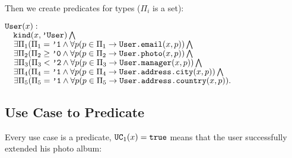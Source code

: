 \documentclass{article}
\begin{document}
        Then we create predicates for types ($\Pi_i$ is a set):

        \begin{maths}
        $\mbox{\texttt{User}}(x) :$ \\
        $\quad \mbox{\texttt{kind}}(x, \mbox{\texttt{'User}}) \bigwedge$ \\
        $\quad \exists \Pi_1 (\Pi_1 = \mbox{\texttt{'1}} \wedge \forall p(p \in \Pi_1 \to \mbox{\texttt{User.email}}(x, p)) \bigwedge$ \\
        $\quad \exists \Pi_2 (\Pi_2 \geq \mbox{\texttt{'0}} \wedge \forall p(p \in \Pi_2 \to \mbox{\texttt{User.photo}}(x, p)) \bigwedge$ \\
        $\quad \exists \Pi_3 (\Pi_3 < \mbox{\texttt{'2}} \wedge \forall p(p \in \Pi_3 \to \mbox{\texttt{User.manager}}(x, p)) \bigwedge $ \\
        $\quad \exists \Pi_4 (\Pi_4 = \mbox{\texttt{'1}} \wedge \forall p(p \in \Pi_4 \to \mbox{\texttt{User.address.city}}(x, p)) \bigwedge $ \\
        $\quad \exists \Pi_5 (\Pi_5 = \mbox{\texttt{'1}} \wedge \forall p(p \in \Pi_5 \to \mbox{\texttt{User.address.country}}(x, p)). $ \\
        \end{maths}

    \subsection{Use Case to Predicate}

        Every use case is a predicate, $\mbox{\texttt{UC}}_1(x) = \mbox{\texttt{true}}$ means that the user
        successfully extended his photo album:
\end{document}
